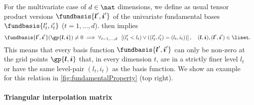 For the multivariate case of $d \in \nat$ dimensions,
we define as usual tensor product versions
$\fundbasis{\*l',\*i'}$ of the univariate fundamental bases
$\fundbasis{l'_t,i'_t}$ ($t = 1, \dotsc, d$).
 then implies
\begin{equation}
  \label{eq:fundamentalPropertyImplicationMV}
  \fundbasis{\*l',\*i'}(\gp{\*l,\*i}) \not= 0
  \implies
  \falarge{t = 1, \dotsc, d}{
    \left[(l'_t < l_t) \lor ((l'_t, i'_t) = (l_t, i_t))\right]
  },\quad
  (\*l, \*i), (\*l',\*i') \in \liset.
  \hspace*{-1mm}
\end{equation}
This means that every basis function
$\fundbasis{\*l',\*i'}$ can only be non-zero
at the grid points $\gp{\*l,\*i}$ that, in every dimension $t$,
are in a strictly finer level $l_t$ or
have the same level-pair $(l_t, i_t)$ as the basis function.
We show an example for this relation in
\cref{fig:fundamentalProperty} (top right).

\paragraph{Triangular interpolation matrix}

